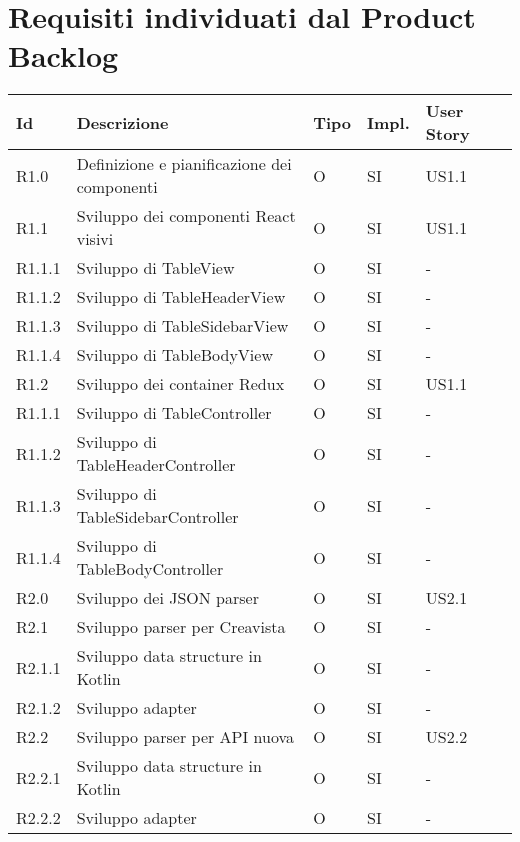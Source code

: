 \section{Requisiti individuati dal Product Backlog}
\begin{longtable} {
		|>{}p{10mm}| 
		|>{}p{60mm}|
		|>{}p{15mm}|
		|>{}p{15mm}|
		|>{}p{15mm}|
		>{}p{0mm}}
	\hline
	\textbf{Id} & \textbf{Descrizione} & \textbf{Tipo} & \textbf{Impl.} & \textbf{User Story} \\ \hline
	R1.0   & Definizione e pianificazione dei componenti & O & SI & US1.1\\ \hline
	
	R1.1   & Sviluppo dei componenti React visivi & O & SI & US1.1 \\ \hline
	R1.1.1 & Sviluppo di TableView                & O & SI & -     \\ \hline
	R1.1.2 & Sviluppo di TableHeaderView          & O & SI & -     \\ \hline
	R1.1.3 & Sviluppo di TableSidebarView         & O & SI & -     \\ \hline
	R1.1.4 & Sviluppo di TableBodyView            & O & SI & -     \\ \hline
	
	R1.2   & Sviluppo dei container Redux       & O & SI & US1.1 \\ \hline
	R1.1.1 & Sviluppo di TableController        & O & SI & -     \\ \hline
	R1.1.2 & Sviluppo di TableHeaderController  & O & SI & -     \\ \hline
	R1.1.3 & Sviluppo di TableSidebarController & O & SI & -     \\ \hline
	R1.1.4 & Sviluppo di TableBodyController    & O & SI & -     \\ \hline
	
	R2.0   & Sviluppo dei JSON parser          & O & SI & US2.1 \\ \hline
	R2.1   & Sviluppo parser per Creavista     & O & SI & -     \\ \hline
	R2.1.1 & Sviluppo data structure in Kotlin & O & SI & -     \\ \hline
	R2.1.2 & Sviluppo adapter                  & O & SI & -     \\ \hline
	
	R2.2   & Sviluppo parser per API nuova     & O & SI & US2.2 \\ \hline
	R2.2.1 & Sviluppo data structure in Kotlin & O & SI & -     \\ \hline
	R2.2.2 & Sviluppo adapter                  & O & SI & -     \\ \hline
	\hline
\end{longtable}